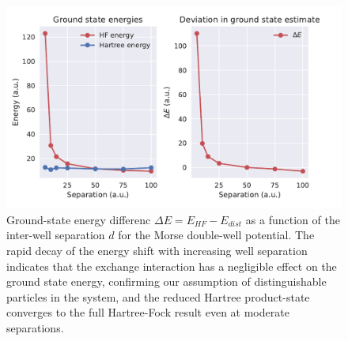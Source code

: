 \documentclass{subfiles}
\begin{document}
\begin{figure}[h!]
    \centering
    \includegraphics[width=1.0\textwidth]{figs/exchange_shift.pdf}
    \caption{Ground-state energy differenc $\Delta E = E_{HF} - E_{dist}$ as a function of the inter-well separation $d$ for the Morse double-well potential. The rapid decay of the energy shift with increasing well separation indicates that the exchange interaction has a negligible effect on the ground state energy, confirming our assumption of distinguishable particles in the system, and the reduced Hartree product-state converges to the full Hartree-Fock result even at moderate separations.}
    \label{fig:exchange_shift}
\end{figure}
\end{document}
